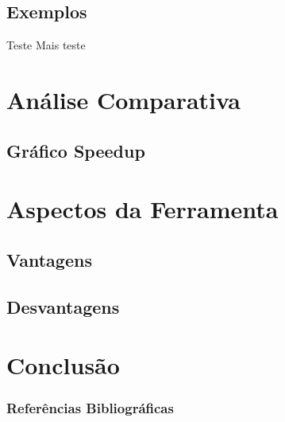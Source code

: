 \documentclass{beamer}
\begin{document}
\subsection{Exemplos}
\begin{frame}
    \begin{block}{Teste}
        Mais teste
    \end{block}
\end{frame}

\section{Análise Comparativa}
	\subsection{Gráfico Speedup}
	
\section{Aspectos da Ferramenta}
	\subsection{Vantagens}
	\subsection{Desvantagens}

\section{Conclusão}

\begin{frame}%
\frametitle{Referências Bibliográficas}
    \tiny{}
    
\end{frame}
\end{document}
